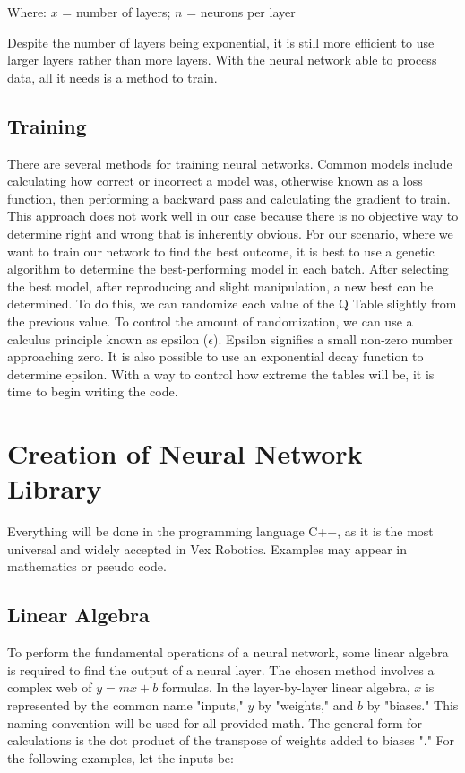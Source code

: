 Where: \(x\) = number of layers; \(n\) = neurons per layer

Despite the number of layers being exponential, it is still more efficient to use larger layers rather than more layers. With the neural network able to process data, all it needs is a method to train.

\subsection*{Training}

There are several methods for training neural networks. Common models include calculating how correct or incorrect a model was, otherwise known as a loss function, then performing a backward pass and calculating the gradient to train. This approach does not work well in our case because there is no objective way to determine right and wrong that is inherently obvious. For our scenario, where we want to train our network to find the best outcome, it is best to use a genetic algorithm to determine the best-performing model in each batch. After selecting the best model, after reproducing and slight manipulation, a new best can be determined. To do this, we can randomize each value of the Q Table slightly from the previous value. To control the amount of randomization, we can use a calculus principle known as epsilon ($\epsilon$). Epsilon signifies a small non-zero number approaching zero. It is also possible to use an exponential decay function to determine epsilon. With a way to control how extreme the tables will be, it is time to begin writing the code.

\section*{Creation of Neural Network Library}

Everything will be done in the programming language C++, as it is the most universal and widely accepted in Vex Robotics. Examples may appear in mathematics or pseudo code.

\subsection*{Linear Algebra}

To perform the fundamental operations of a neural network, some linear algebra is required to find the output of a neural layer. The chosen method involves a complex web of \(y = mx + b\) formulas. In the layer-by-layer linear algebra, \(x\) is represented by the common name "inputs," \(y\) by "weights," and \(b\) by "biases." This naming convention will be used for all provided math. The general form for calculations is the dot product of the transpose of weights added to biases "\cite{sentdex_nn}." For the following examples, let the inputs be:

